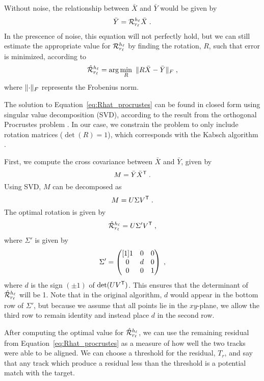 Without noise, the relationship between $\bar{X}$ and $\bar{Y}$ would be given by
\begin{equation}
    \bar{Y} = {\mathcal{R}}_{{r_\ell}}^{{h_\ell}}\bar{X}\;.
\end{equation}
In the prescence of noise, this equation will not perfectly hold, but we can still estimate the appropriate value for ${\mathcal{R}}_{{r_\ell}}^{{h_\ell}}$ by finding the rotation, $R$, such that error is minimized, according to
\begin{equation} \label{eq:Rhat_procrustes}
    \hat{\mathcal{R}}_{{r_\ell}}^{{h_\ell}} = \arg\min\limits_{R}\hspace{0.5em} \lVert R\bar{X} - \bar{Y}\rVert_F\;,
\end{equation}
where $\lVert\cdot\rVert_F$ represents the Frobenius norm.

The solution to Equation~\eqref{eq:Rhat_procrustes} can be found in closed form using singular value decomposition (SVD), according to the result from the orthogonal Procrustes problem \cite{Schonemann1966}.
In our case, we constrain the problem to only include rotation matrices ($\det(R) = 1$), which corresponds with the Kabsch algorithm \cite{Kabsch78}.

First, we compute the cross covariance between $\bar{X}$ and $\bar{Y}$, given by
\begin{equation}
    M = \bar{Y}\bar{X}^{\mathsf{T}}\;.
\end{equation}
Using SVD, $M$ can be decomposed as
\begin{equation}
    M = U\Sigma V^{\mathsf{T}}\;.
\end{equation}
The optimal rotation is given by
\begin{equation} \label{eq:Rhat_svd}
    \hat{\mathcal{R}}_{{r_\ell}}^{{h_\ell}} = U\Sigma' V^{\mathsf{T}}\;,
\end{equation}
where $\Sigma'$ is given by
\begin{equation}
    \Sigma' = \begin{pmatrix}[1] 1 & 0 & 0 \\
                    0 & d & 0 \\
                    0 & 0 & 1 \end{pmatrix}\;,
\end{equation}
where $d$ is the sign $(\pm 1)$ of $\det(UV^{\mathsf{T}})$. This ensures that the determinant of $\hat{\mathcal{R}}_{{r_\ell}}^{{h_\ell}}$ will be 1. Note that in the original algorithm, $d$ would appear in the bottom row of $\Sigma'$, but because we assume that all points lie in the $xy$-plane, we allow the third row to remain identity and instead place $d$ in the second row.

After computing the optimal value for $\hat{\mathcal{R}}_{{r_\ell}}^{{h_\ell}}$, we can use the remaining residual from Equation~\eqref{eq:Rhat_procrustes} as a measure of how well the two tracks were able to be aligned. We can choose a threshold for the residual, $T_r$, and say that any track which produce a residual less than the threshold is a potential match with the target.

